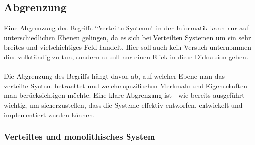 \subsection{Abgrenzung}
Eine Abgrenzung des Begriffs \enquote{Verteilte Systeme} in der Informatik kann nur auf unterschiedlichen Ebenen gelingen, da es sich bei Verteilten Systemen um ein sehr breites und vielschichtiges Feld handelt. Hier soll auch kein Versuch unternommen dies vollständig zu tun, sondern es soll nur einen Blick in diese Diskussion geben. 
\\\\
Die Abgrenzung des Begriffs hängt davon ab, auf welcher Ebene man das verteilte System betrachtet und welche spezifischen Merkmale und Eigenschaften man berücksichtigen möchte. Eine klare Abgrenzung ist - wie bereits ausgeführt - wichtig, um sicherzustellen, dass die Systeme effektiv entworfen, entwickelt und implementiert werden können.

\subsubsection{Verteiltes und monolithisches System}

